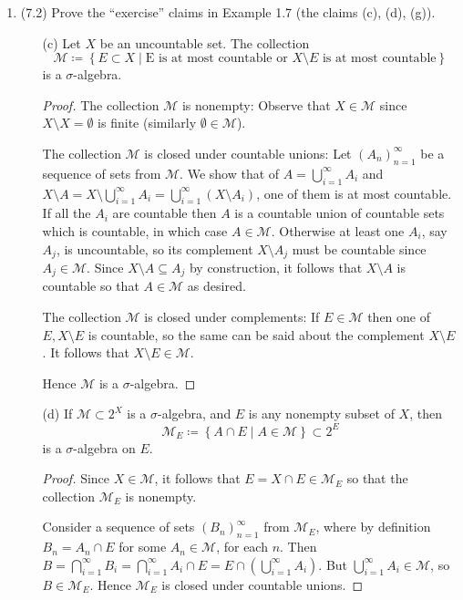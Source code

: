 \documentclass[11pt]{article}
\newcommand{\cbr}[1]{\left\{#1\right\}}
\begin{document}
\begin{enumerate}
    \item (7.2) Prove the ``exercise'' claims in Example 1.7 (the claims (c), (d), (g)). \begin{enumerate}
      \item[(c)] Let $X$ be an uncountable set. The collection \[\mathscr{M} \coloneqq \cbr{E\subset X \mid \text{E is at most countable or $X\setminus E$ is at most countable}}\] is a $\sigma$-algebra. \begin{proof}
        The collection $\mathscr{M}$ is nonempty: Observe that $X\in \mathscr{M}$ since $X\setminus X = \emptyset$ is finite (similarly $\emptyset \in\mathscr{M}$). 

        The collection $\mathscr{M}$ is closed under countable unions: Let $(A_n)_{n=1}^\infty$ be a sequence of sets from $\mathscr{M}$. We show that of $A = \bigcup_{i=1}^\infty A_i$ and $X\setminus A = X\setminus \bigcup_{i=1}^\infty A_i = \bigcup_{i=1}^\infty (X\setminus A_i)$, one of them is at most countable. If all the $A_i$ are countable then $A$ is a countable union of countable sets which is countable, in which case $A\in \mathscr{M}$. Otherwise at least one $A_i$, say $A_j$, is uncountable, so its complement $X\setminus A_j$ must be countable since $A_j\in \mathscr{M}$. Since $X\setminus A\subseteq A_j$ by construction, it follows that $X\setminus A$ is countable so that $A\in \mathscr{M}$ as desired.

        The collection $\mathscr{M}$ is closed under complements: If $E\in\mathscr{M}$ then one of $E, X\setminus E$ is countable, so the same can be said about the complement $X\setminus E$. It follows that $X\setminus E\in \mathscr{M}$.

        Hence $\mathscr{M}$ is a $\sigma$-algebra.
      \end{proof}
      \item[(d)] If $\mathscr{M}\subset 2^X$ is a $\sigma$-algebra, and $E$ is any nonempty subset of $X$, then \[\mathscr{M}_E\coloneqq \cbr{A\cap E\mid A\in \mathscr{M}}\subset 2^E\] is a $\sigma$-algebra on $E$. \begin{proof}
        Since $X\in\mathscr{M}$, it follows that $E = X\cap E\in \mathscr{M}_E$ so that the collection $\mathscr{M}_E$ is nonempty. 

        Consider a sequence of sets $(B_n)_{n=1}^\infty$ from $\mathscr{M}_E$, where by definition $B_n = A_n\cap E$ for some $A_n\in \mathscr{M}$, for each $n$. Then $B = \bigcap_{i=1}^\infty B_i = \bigcap_{i=1}^\infty A_i\cap E = E\cap\left(\bigcup_{i=1}^\infty A_i\right)$. But $\bigcup_{i=1}^\infty A_i\in\mathscr{M}$, so $B\in\mathscr{M}_E$. Hence $\mathscr{M}_E$ is closed under countable unions.


\end{proof}
\end{enumerate}
\end{enumerate}
\end{document}
